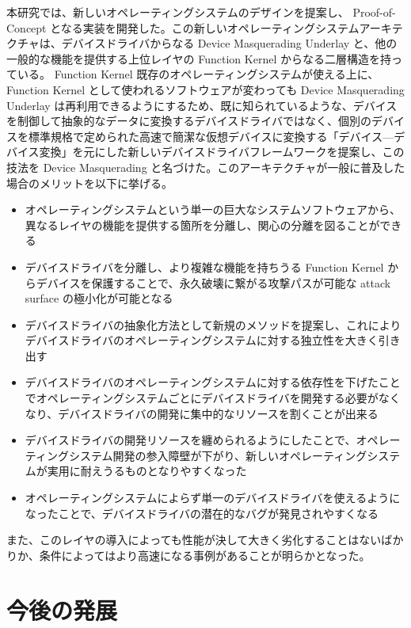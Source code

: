 \documentclass[a4paper,11pt,report]{ltjsbook}
\begin{document}
本研究では、新しいオペレーティングシステムのデザインを提案し、 Proof-of-Concept となる実装を開発した。この新しいオペレーティングシステムアーキテクチャは、デバイスドライバからなる Device Masquerading Underlay と、他の一般的な機能を提供する上位レイヤの Function Kernel からなる二層構造を持っている。 Function Kernel 既存のオペレーティングシステムが使える上に、 Function Kernel として使われるソフトウェアが変わっても Device Masquerading Underlay は再利用できるようにするため、既に知られているような、デバイスを制御して抽象的なデータに変換するデバイスドライバではなく、個別のデバイスを標準規格で定められた高速で簡潔な仮想デバイスに変換する「デバイス---デバイス変換」を元にした新しいデバイスドライバフレームワークを提案し、この技法を Device Masquerading と名づけた。このアーキテクチャが一般に普及した場合のメリットを以下に挙げる。

\begin{itemize}
\item オペレーティングシステムという単一の巨大なシステムソフトウェアから、異なるレイヤの機能を提供する箇所を分離し、関心の分離を図ることができる
\item デバイスドライバを分離し、より複雑な機能を持ちうる Function Kernel からデバイスを保護することで、永久破壊に繋がる攻撃パスが可能な attack surface の極小化が可能となる
\item デバイスドライバの抽象化方法として新規のメソッドを提案し、これによりデバイスドライバのオペレーティングシステムに対する独立性を大きく引き出す
\item デバイスドライバのオペレーティングシステムに対する依存性を下げたことでオペレーティングシステムごとにデバイスドライバを開発する必要がなくなり、デバイスドライバの開発に集中的なリソースを割くことが出来る
\item デバイスドライバの開発リソースを纏められるようにしたことで、オペレーティングシステム開発の参入障壁が下がり、新しいオペレーティングシステムが実用に耐えうるものとなりやすくなった
\item オペレーティングシステムによらず単一のデバイスドライバを使えるようになったことで、デバイスドライバの潜在的なバグが発見されやすくなる
\end{itemize}

また、このレイヤの導入によっても性能が決して大きく劣化することはないばかりか、条件によってはより高速になる事例があることが明らかとなった。

\section{今後の発展}
\end{document}
